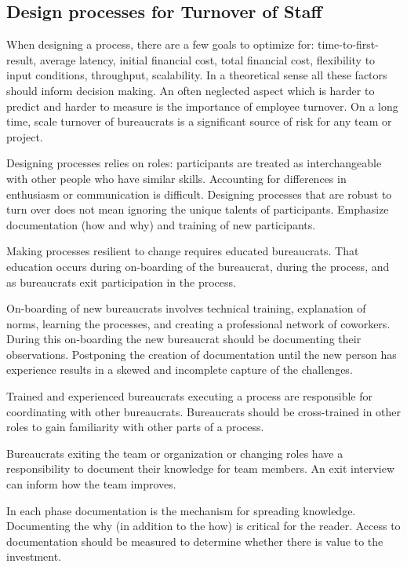 \subsection{Design processes for Turnover of Staff\label{sec:turnover}}


When designing a process, there are a few goals to optimize for: time-to-first-result, average latency, initial financial cost, total financial cost, flexibility to input conditions, throughput, scalability. In a theoretical sense all these factors should inform decision making. An often neglected aspect which is harder to predict and harder to measure is the importance of employee turnover. On a long time, scale turnover of bureaucrats is a significant source of risk for any team or project. 

Designing processes relies on roles: participants are treated as interchangeable with other people who have similar skills. Accounting for differences in enthusiasm or communication is difficult. 
Designing processes that are robust to turn over does not mean ignoring the unique talents of participants. 
Emphasize documentation (how and why) and training of new participants. 

Making processes resilient to change requires educated bureaucrats. That education occurs during on-boarding of the bureaucrat, during the process, and as bureaucrats exit participation in the process. 

On-boarding of new bureaucrats involves technical training, explanation of norms, learning the processes, and creating a professional network of coworkers. During this on-boarding the new bureaucrat should be documenting their observations. Postponing the creation of documentation until the new person has experience results in a skewed and incomplete capture of the challenges.

Trained and experienced bureaucrats executing a process are responsible for coordinating with other bureaucrats. Bureaucrats should be cross-trained in other roles to gain familiarity with other parts of a process. 

Bureaucrats exiting the team or organization or changing roles have a responsibility to document their knowledge for team members. An exit interview can inform how the team improves. 

In each phase documentation is the mechanism for spreading knowledge. Documenting the why (in addition to the how) is critical for the reader. Access to documentation should be measured to determine whether there is value to the investment. 